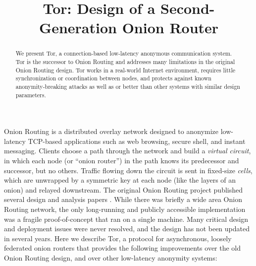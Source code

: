 \documentclass[times,10pt,twocolumn]{article}
\begin{document}

\title{Tor: Design of a Second-Generation Onion Router}


\maketitle
\thispagestyle{empty}

\begin{abstract}
We present Tor, a connection-based low-latency anonymous communication
system. Tor is the successor to Onion Routing
and addresses many limitations in the original Onion Routing design.
Tor works in a real-world Internet environment,
requires little synchronization or coordination between nodes, and
protects against known anonymity-breaking attacks as well
as or better than other systems with similar design parameters.
\end{abstract}



\label{sec:intro}

Onion Routing is a distributed overlay network designed to anonymize
low-latency TCP-based applications such as web browsing, secure shell,
and instant messaging. Clients choose a path through the network and
build a \emph{virtual circuit}, in which each node (or ``onion router'') 
in the path knows its
predecessor and successor, but no others. Traffic flowing down the circuit
is sent in fixed-size \emph{cells}, which are unwrapped by a symmetric key
at each node (like the layers of an onion) and relayed downstream. The
original Onion Routing project published several design and analysis
papers
\cite{or-jsac98,or-discex00,or-ih96,or-pet00}. While there was briefly
a wide area Onion Routing network,
the only long-running and publicly accessible
implementation was a fragile proof-of-concept that ran on a single
machine. Many critical design and deployment issues were never resolved,
and the design has not been updated in several years.
Here we describe Tor, a protocol for asynchronous, loosely
federated onion routers that provides the following improvements over
the old Onion Routing design, and over other low-latency anonymity systems:
\end{document}
